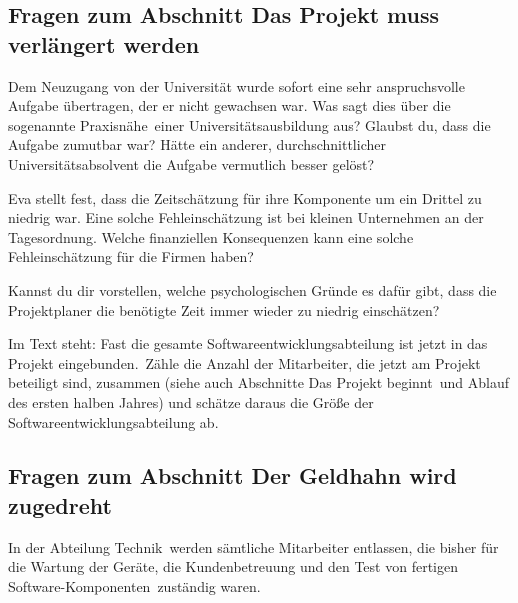 \subsection*{Fragen zum Abschnitt \glqq Das Projekt muss verlängert werden\grqq}
\begin{compactenum}[a)]
\item Dem Neuzugang von der Universität wurde sofort eine sehr anspruchsvolle
Aufgabe übertragen, der er nicht gewachsen war. Was sagt dies über die
sogenannte \glqq Praxisnähe\grqq\ einer Universitätsausbildung aus? Glaubst du,
dass die Aufgabe zumutbar war? Hätte ein anderer, durchschnittlicher
Universitätsabsolvent die Aufgabe vermutlich besser gelöst?
\item Eva stellt fest, dass die Zeitschätzung für ihre Komponente um ein Drittel
zu niedrig war. Eine solche Fehleinschätzung ist bei kleinen Unternehmen an der
Tagesordnung. Welche finanziellen Konsequenzen kann eine solche
Fehleinschätzung für die Firmen haben?

Kannst du dir vorstellen, welche psychologischen Gründe es dafür gibt, dass die
Projektplaner die benötigte Zeit immer wieder zu niedrig einschätzen? 
\item Im Text steht: \glqq Fast die gesamte Softwareentwicklungsabteilung ist
jetzt in das Projekt eingebunden.\grqq\ Zähle die Anzahl der Mitarbeiter, die
jetzt am Projekt beteiligt sind, zusammen (siehe auch Abschnitte \glqq Das
Projekt beginnt\grqq\ und \glqq Ablauf des ersten halben Jahres\grqq ) und
schätze daraus die Größe der Softwareentwicklungsabteilung ab.
\end{compactenum}

\subsection*{Fragen zum Abschnitt \glqq Der Geldhahn wird zugedreht\grqq}

In der Abteilung \glqq Technik\grqq\ werden sämtliche Mitarbeiter entlassen,
die bisher für \glqq die Wartung der Geräte, die Kundenbetreuung und den Test
von fertigen Software-Komponenten\grqq\ zuständig waren.

